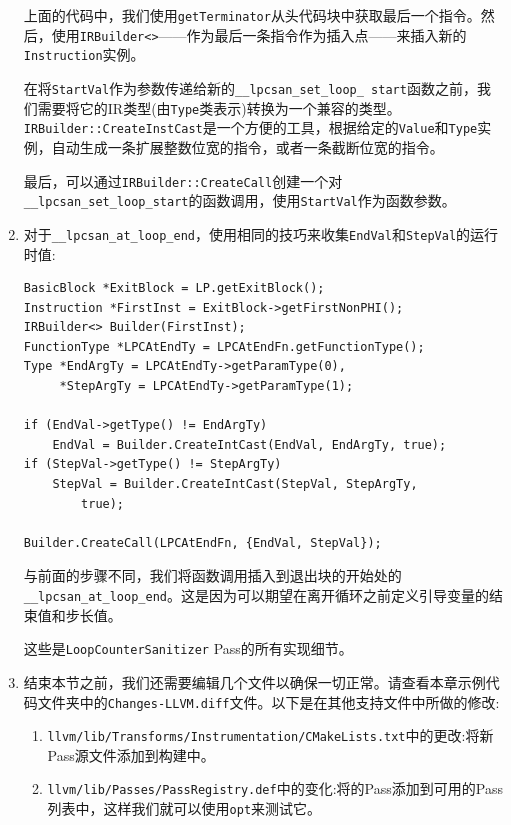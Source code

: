 \begin{enumerate}
上面的代码中，我们使用\texttt{getTerminator}从头代码块中获取最后一个指令。然后，使用\texttt{IRBuilder<>}——作为最后一条指令作为插入点——来插入新的\texttt{Instruction}实例。

在将\texttt{StartVal}作为参数传递给新的\texttt{\_\_lpcsan\_set\_loop\_ start}函数之前，我们需要将它的IR类型(由\texttt{Type}类表示)转换为一个兼容的类型。\texttt{IRBuilder::CreateInstCast}是一个方便的工具，根据给定的\texttt{Value}和\texttt{Type}实例，自动生成一条扩展整数位宽的指令，或者一条截断位宽的指令。

最后，可以通过\texttt{IRBuilder::CreateCall}创建一个对\texttt{\_\_lpcsan\_set\_loop\_start}的函数调用，使用\texttt{StartVal}作为函数参数。

\item 对于\texttt{\_\_lpcsan\_at\_loop\_end}，使用相同的技巧来收集\texttt{EndVal}和\texttt{StepVal}的运行时值:

\begin{lstlisting}[style=styleCXX]
BasicBlock *ExitBlock = LP.getExitBlock();
Instruction *FirstInst = ExitBlock->getFirstNonPHI();
IRBuilder<> Builder(FirstInst);
FunctionType *LPCAtEndTy = LPCAtEndFn.getFunctionType();
Type *EndArgTy = LPCAtEndTy->getParamType(0),
     *StepArgTy = LPCAtEndTy->getParamType(1);

if (EndVal->getType() != EndArgTy)
	EndVal = Builder.CreateIntCast(EndVal, EndArgTy, true);
if (StepVal->getType() != StepArgTy)
	StepVal = Builder.CreateIntCast(StepVal, StepArgTy,
		true);
		
Builder.CreateCall(LPCAtEndFn, {EndVal, StepVal});
\end{lstlisting}

与前面的步骤不同，我们将函数调用插入到退出块的开始处的\texttt{\_\_lpcsan\_at\_loop\_end}。这是因为可以期望在离开循环之前定义引导变量的结束值和步长值。

这些是\texttt{LoopCounterSanitizer} Pass的所有实现细节。

\item 结束本节之前，我们还需要编辑几个文件以确保一切正常。请查看本章示例代码文件夹中的\texttt{Changes-LLVM.diff}文件。以下是在其他支持文件中所做的修改:

\begin{enumerate}[label=\roman*.]
\item \texttt{llvm/lib/Transforms/Instrumentation/CMakeLists.txt}中的更改:将新Pass源文件添加到构建中。
\item \texttt{llvm/lib/Passes/PassRegistry.def}中的变化:将的Pass添加到可用的Pass列表中，这样我们就可以使用\texttt{opt}来测试它。
\end{enumerate}

\end{enumerate}


